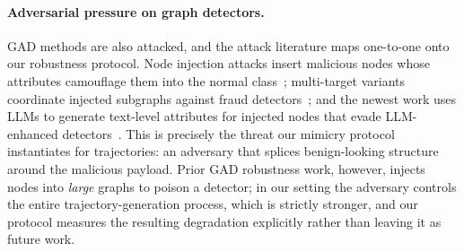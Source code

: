 \paragraph{Adversarial pressure on graph detectors.} GAD methods are also attacked, and the attack literature maps one-to-one onto our robustness protocol. Node injection attacks insert malicious nodes whose attributes camouflage them into the normal class~\cite{ju2022blackbox,tao2022adversarial}; multi-target variants coordinate injected subgraphs against fraud detectors~\cite{choi2024unveiling}; and the newest work uses LLMs to generate text-level attributes for injected nodes that evade LLM-enhanced detectors~\cite{lyu2025navigating,ma2025graphtextack}. This is precisely the threat our mimicry protocol instantiates for trajectories: an adversary that splices benign-looking structure around the malicious payload. Prior GAD robustness work, however, injects nodes into \emph{large} graphs to poison a detector; in our setting the adversary controls the entire trajectory-generation process, which is strictly stronger, and our protocol measures the resulting degradation explicitly rather than leaving it as future work.
